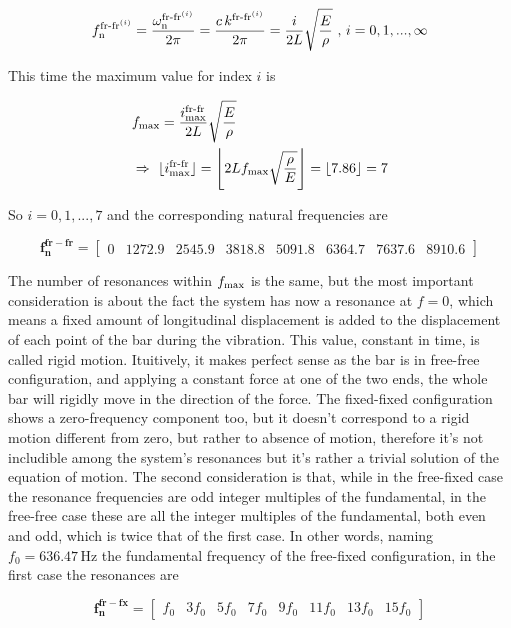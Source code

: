 \documentclass[a4paper,12pt,oneside]{article}
\begin{document}
\[
	f_\textup{n}^{\textup{fr-fr}^{(i)}} =
		\frac{\omega_\textup{n}^{\textup{fr-fr}^{(i)}}}{2 \pi} =
		\frac{c \, k^{\textup{fr-fr}^{(i)}}}{2 \pi} =
		\frac{i}{2L} \sqrt{\frac{E}{\rho}} ~ \text{,} ~ i = 0,1,...,\infty
\]

This time the maximum value for index $ i $ is

\[ \begin{split}
	& f_\textup{max} = \frac{i^\textup{fr-fr}_\textup{max}}{2L}
		\sqrt{\frac{E}{\rho}} \\
	& \Rightarrow ~ \lfloor i^\textup{fr-fr}_\textup{max} \rfloor =
		\Biggl\lfloor 2 L f_\textup{max} \sqrt{\frac{\rho}{E}} \Biggr\rfloor =
		\lfloor 7.86 \rfloor = 7
\end{split} \]

So $ i = 0,1,...,7 $ and the corresponding natural frequencies are

\[
	\mathbf{f_n^{fr-fr}} =	\begin{bmatrix}
																	0					& 1272.9	& 2545.9	& 3818.8
																	& 5091.8	& 6364.7	& 7637.6	& 8910.6
													\end{bmatrix}
\]

The number of resonances within $ f_\textup{max} $ is the same, but the most important consideration is about the fact the system has now a resonance at $ f = 0 $, which means a fixed amount of longitudinal displacement is added to the displacement of each point of the bar during the vibration. This value, constant in time, is called rigid motion. Ituitively, it makes perfect sense as the bar is in free-free configuration, and applying a constant force at one of the two ends, the whole bar will rigidly move in the direction of the force. The fixed-fixed configuration shows a zero-frequency component too, but it doesn't correspond to a rigid motion different from zero, but rather to absence of motion, therefore it's not includible among the system's resonances but it's rather a trivial solution of the equation of motion. The second consideration is that, while in the free-fixed case the resonance frequencies are odd integer multiples of the fundamental, in the free-free case these are all the integer multiples of the fundamental, both even and odd, which is twice that of the first case. In other words, naming $ f_0 = 636.47 \, \text{Hz} $ the fundamental frequency of the free-fixed configuration, in the first case the resonances are

\[
	\mathbf{f_n^{fr-fx}} =	\begin{bmatrix}
														f_0	& 3f_0	& 5f_0	& 7f_0	& 9f_0	& 11f_0	& 13f_0	& 15f_0
													\end{bmatrix}
\]
\end{document}
